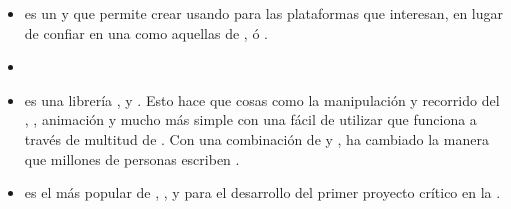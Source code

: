 \begin{itemize}
		\item
			\textbf{\phonegapNAME} es un \frameworkPC \freePC y \openSourcePC que permite crear \appsINT \mobileINT usando \webINT \apisAS para las plataformas que interesan, en lugar de confiar en una \apisAS \platformSpecificCPT como aquellas de \iosNAME, \windowsPhoneNAME ó \androidNAME \cite{online_technology_phonegap_mobile_app_plataforms}.

		\item \textbf{\extjsNAME}

		\item
			\textbf{\jqueryNAME} es una librería \javaScriptNAME \fastQA, \smallQA y \featureRichQA. Esto hace que cosas como la manipulación y recorrido del \htmlDocumentINT, \eventHandlingPL, animación y \ajaxNAME mucho más simple con una \apisAS fácil de utilizar que funciona a través de multitud de \browsersINT. Con una combinación de \versatilityQA y \extensibilityQA, \jqueryNAME ha cambiado la manera que millones de personas escriben \javaScriptNAME \cite{online_technology_jquery_officialSite}.
		
		
		
		\item \textbf{\bootstrap} es el \frameworkPC más popular de \htmlNAME, \cssNAME, y \javaScriptNAME para el desarrollo del primer proyecto \mobileINT crítico en la \webINT \cite{technology_bootstrap}.
	\end{itemize}

